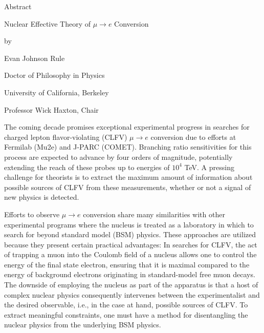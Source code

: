 \documentclass{book}[letterpaper,12pt]
\begin{document}
\newpage
{}
\begin{center}
Abstract

\vspace{1cm}
Nuclear Effective Theory of $\mu\rightarrow e$ Conversion

\vspace{0.5cm}
by

\vspace{0.5cm}
Evan Johnson Rule

\vspace{0.5cm}
Doctor of Philosophy in Physics

\vspace{0.5cm}
University of California, Berkeley

\vspace{0.5cm}
Professor Wick Haxton, Chair
\end{center}
The coming decade promises exceptional experimental progress in searches for charged lepton flavor-violating (CLFV) $\mu\rightarrow e$ conversion due to efforts at Fermilab (Mu2e) and J-PARC (COMET). Branching ratio sensitivities for this process are expected to advance by four orders of magnitude, potentially extending the reach of these probes up to energies of $10^4$ TeV. A pressing challenge for theorists is to extract the maximum amount of information about possible sources of CLFV from these measurements, whether or not a signal of new physics is detected. 

Efforts to observe $\mu\rightarrow e$ conversion share many similarities with other experimental programs where the nucleus is treated as a laboratory in which to search for beyond standard model (BSM) physics. These approaches are utilized because they present certain practical advantages: In searches for CLFV, the act of trapping a muon into the Coulomb field of a nucleus allows one to control the energy of the final state electron, ensuring that it is maximal compared to the energy of background electrons originating in standard-model free muon decays. The downside of employing the nucleus as part of the apparatus is that a host of complex nuclear physics consequently intervenes between the experimentalist and the desired observable, i.e., in the case at hand, possible sources of CLFV. To extract meaningful constraints, one must have a method for disentangling the nuclear physics from the underlying BSM physics.
\end{document}
